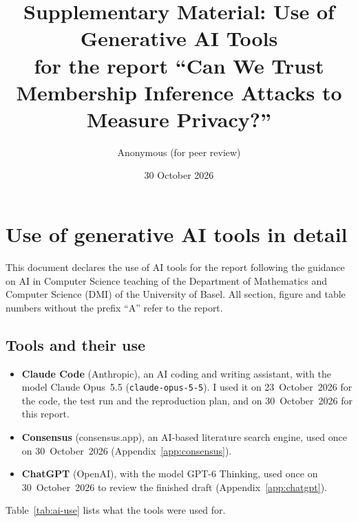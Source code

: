 \documentclass[a4paper]{article}
\author{Anonymous (for peer review)}
\title{Supplementary Material: Use of Generative AI Tools\\[0.3em]\large for the report ``Can We Trust Membership Inference Attacks to Measure Privacy?''}
\date{30 October 2026}
\begin{document}
\sloppy
\maketitle
\appendix
\renewcommand{\thetable}{A.\arabic{table}}

\section{Use of generative AI tools in detail}
\label{app:prompts}

This document declares the use of AI tools for the report following the guidance on AI in Computer Science teaching of the Department of Mathematics and Computer Science (DMI) of the University of Basel.
All section, figure and table numbers without the prefix ``A'' refer to the report.

\subsection{Tools and their use}
\label{app:tools}

\begin{itemize}
  \item \textbf{Claude Code} (Anthropic), an AI coding and writing assistant, with the model Claude Opus~5.5 (\texttt{claude-opus-5-5}). I used it on 23~October~2026 for the code, the test run and the reproduction plan, and on 30~October~2026 for this report.
  \item \textbf{Consensus} (consensus.app), an AI-based literature search engine, used once on 30~October~2026 (Appendix~\ref{app:consensus}).
  \item \textbf{ChatGPT} (OpenAI), with the model GPT-6 Thinking, used once on 30~October~2026 to review the finished draft (Appendix~\ref{app:chatgpt}).
\end{itemize}
Table~\ref{tab:ai-use} lists what the tools were used for.
\end{document}
